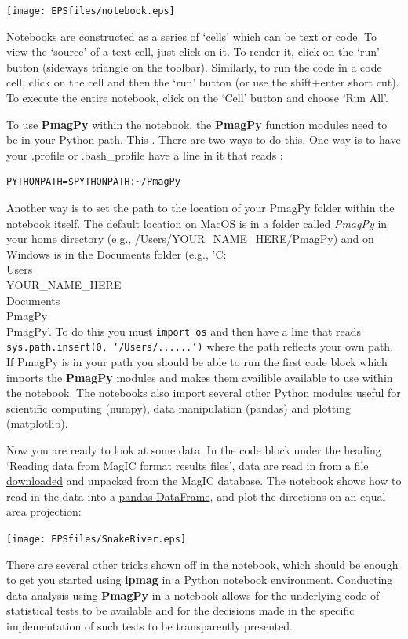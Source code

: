 \documentclass[11pt]{book}
\begin{document}
{{{{\texttt{[image: EPSfiles/notebook.eps]}

Notebooks are constructed as a series of `cells' which can be text or code.  To view the `source' of a text cell, just click on it.  To render it, click on the `run' button (sideways triangle on the toolbar).  Similarly, to run the code in a code cell, click on the cell and then the `run' button (or use the shift+enter short cut).   To execute the entire notebook, click on the `Cell' button and choose 'Run All'.

To use {\bf PmagPy} within the notebook, the {\bf PmagPy} function modules need to be in your Python path. This . There are two ways to do this. One way is to have your .profile or .bash_profile have a line in it that reads :

\begin{verbatim}
PYTHONPATH=$PYTHONPATH:~/PmagPy
\end{verbatim}

Another way is to set the path to the location of your PmagPy folder within the notebook itself. The default location on  MacOS is in a folder called {\it PmagPy} in your home directory (e.g., /Users/YOUR\_NAME\_HERE/PmagPy) and on Windows is in the Documents folder (e.g., 'C:\\Users\\YOUR\_NAME\_HERE\\Documents\\PmagPy\\PmagPy'. To do this you must \texttt{import os} and then have a line that reads \texttt{sys.path.insert(0, `/Users/......')} where the path reflects your own path.   If PmagPy is in your path you should be able to run the first code block which imports the {\bf PmagPy} modules and makes them availible available to use within the notebook.  The notebooks also import several other Python modules useful for scientific computing (numpy),  data manipulation (pandas) and plotting (matplotlib).

 Now you are ready to look at some data.  In the code block under the heading `Reading data from MagIC format results files',  data are read in from a file \href{#magic_download}{downloaded} and unpacked from the MagIC database.   The notebook shows how to read in the data into a \href{#pandas}{pandas DataFrame}, and plot the directions on an equal area projection:

\texttt{[image: EPSfiles/SnakeRiver.eps]}

There are several other tricks shown off in the notebook, which should be enough to get you started using {\bf ipmag} in a Python notebook environment.  Conducting data analysis  using {\bf PmagPy} in a notebook allows for the underlying code of statistical tests to be available and for the decisions made in the specific implementation of such tests to be transparently presented.

}}}}
\end{document}
